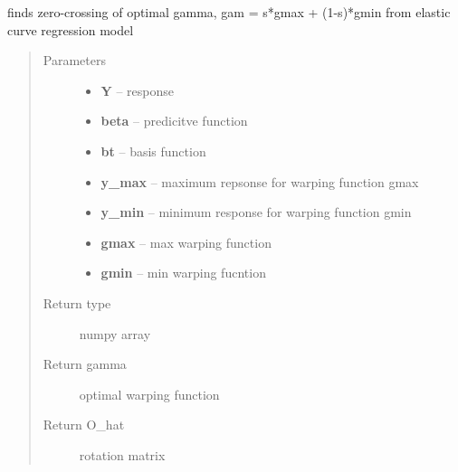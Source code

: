 \documentclass[letterpaper,10pt,english]{sphinxmanual}
\begin{document}
\begin{fulllineitems}
\label{curve_functions:curve_functions.curve_zero_crossing}
finds zero-crossing of optimal gamma, gam = s*gmax + (1-s)*gmin
from elastic curve regression model
\begin{quote}\begin{description}
\item[{Parameters}] \leavevmode\begin{itemize}
\item {} 
\textbf{Y} -- response

\item {} 
\textbf{beta} -- predicitve function

\item {} 
\textbf{bt} -- basis function

\item {} 
\textbf{y\_max} -- maximum repsonse for warping function gmax

\item {} 
\textbf{y\_min} -- minimum response for warping function gmin

\item {} 
\textbf{gmax} -- max warping function

\item {} 
\textbf{gmin} -- min warping fucntion

\end{itemize}

\item[{Return type}] \leavevmode
numpy array

\item[{Return gamma}] \leavevmode
optimal warping function

\item[{Return O\_hat}] \leavevmode
rotation matrix

\end{description}\end{quote}

\end{fulllineitems}

\end{document}
